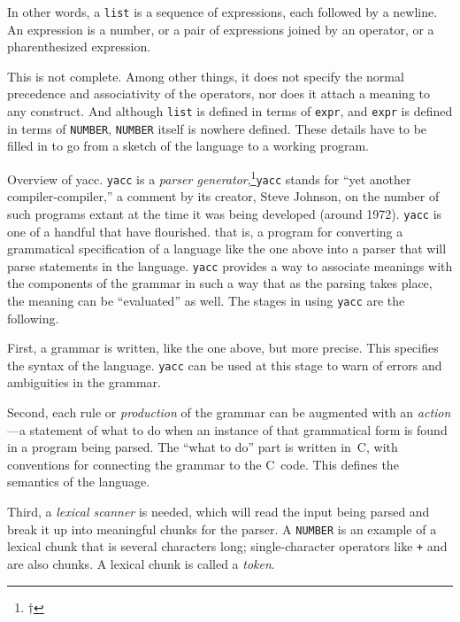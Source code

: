 \medbreak
\indent\indent\vbox{}
\medskip
\noindent
In other words, a {\tt list} is a sequence of expressions, each
followed by a newline. An expression is a number, or a pair of
expressions joined by an operator, or a pharenthesized expression.

This is not complete. Among other things, it does not specify
the normal precedence and associativity of the operators, nor
does it attach a meaning to any construct. And although {\tt list}
is defined in terms of {\tt expr}, and {\tt expr} is defined in
terms of {\tt NUMBER}, {\tt NUMBER} itself is nowhere defined.
These details have to be filled in to go from a sketch of the
language to a working program.

\subsect Overview of yacc.
{\tt yacc} is a {\it parser generator},\footnote{$\dag$}{{\tt yacc}
stands for ``yet another compiler-compiler,'' a comment by its
creator, Steve Johnson, on the number of such programs extant
at the time it was being developed (around 1972). {\tt yacc}
is one of a handful that have flourished.} that is, a program
for converting a grammatical specification of a language like
the one above into a parser that will parse statements in the
language. {\tt yacc} provides a way to associate meanings with
the components of the grammar in such a way that as the parsing
takes place, the meaning can be ``evaluated'' as well. The stages
in using {\tt yacc} are the following.

First, a grammar is written, like the one above, but more precise.
This specifies the syntax of the language. {\tt yacc} can be used
at this stage to warn of errors and ambiguities in the grammar.

Second, each rule or {\it production\/} of the grammar can be
augmented with an {\it action}---a statement of what to do
when an instance of that grammatical form is found in a program
being parsed. The ``what to do'' part is written in~C, with
conventions for connecting the grammar to the C~code.
This defines the semantics of the language.

Third, a {\it lexical scanner\/} is needed, which will read
the input being parsed and break it up into meaningful chunks
for the parser. A {\tt NUMBER} is an example of a lexical
chunk that is several characters long; single-character operators
like {\tt+} and {\tt*} are also chunks. A lexical chunk is called
a {\it token}.

